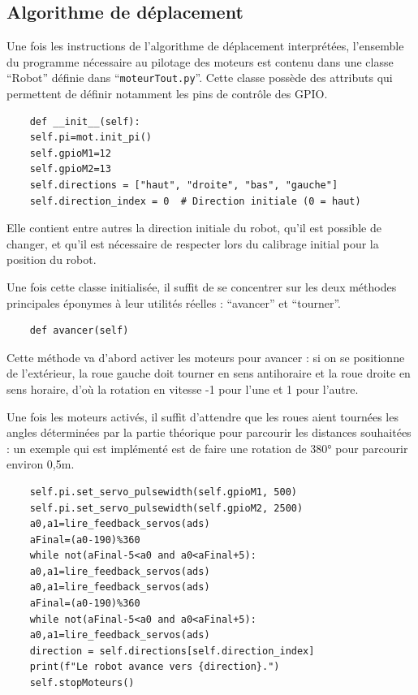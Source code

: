 \documentclass[a4paper,12pt]{report}  %
\begin{document}
\subsection{Algorithme de déplacement}

Une fois les instructions de l’algorithme de déplacement interprétées, l’ensemble du programme nécessaire au pilotage des moteurs est contenu dans une classe “Robot” définie dans “\texttt{moteurTout.py}”. Cette classe possède des attributs qui permettent de définir notamment les pins de contrôle des GPIO.

\begin{lstlisting}
	def __init__(self):
	self.pi=mot.init_pi()
	self.gpioM1=12
	self.gpioM2=13
	self.directions = ["haut", "droite", "bas", "gauche"]
	self.direction_index = 0  # Direction initiale (0 = haut)
\end{lstlisting}

Elle contient entre autres la direction initiale du robot, qu’il est possible de changer, et qu’il est nécessaire de respecter lors du calibrage initial pour la position du robot.

Une fois cette classe initialisée, il suffit de se concentrer sur les deux méthodes principales éponymes à leur utilités réelles : “avancer” et “tourner”.

\begin{lstlisting}
	def avancer(self)
\end{lstlisting}

Cette méthode va d’abord activer les moteurs pour avancer : si on se positionne de l’extérieur, la roue gauche doit tourner en sens antihoraire et la roue droite en sens horaire, d’où la rotation en vitesse -1 pour l’une et 1 pour l’autre.

Une fois les moteurs activés, il suffit d’attendre que les roues aient tournées les angles déterminées par la partie théorique pour parcourir les distances souhaitées : un exemple qui est implémenté est de faire une rotation de 380° pour parcourir environ 0,5m.

\begin{lstlisting}
	self.pi.set_servo_pulsewidth(self.gpioM1, 500)
	self.pi.set_servo_pulsewidth(self.gpioM2, 2500)
	a0,a1=lire_feedback_servos(ads)
	aFinal=(a0-190)%360
	while not(aFinal-5<a0 and a0<aFinal+5):
	a0,a1=lire_feedback_servos(ads)
	a0,a1=lire_feedback_servos(ads)
	aFinal=(a0-190)%360
	while not(aFinal-5<a0 and a0<aFinal+5):
	a0,a1=lire_feedback_servos(ads)
	direction = self.directions[self.direction_index]
	print(f"Le robot avance vers {direction}.")
	self.stopMoteurs()
\end{lstlisting}
\end{document}
